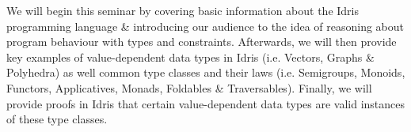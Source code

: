 We will begin this seminar by covering basic information about the Idris programming language \& introducing our audience to the idea of reasoning about program behaviour with types and constraints. Afterwards,
we will then provide key examples of value-dependent data types in Idris (i.e. Vectors, Graphs \& Polyhedra) as well common type classes and their laws (i.e. Semigroups, Monoids, Functors, Applicatives, Monads, Foldables \& Traversables).
Finally, we will provide proofs in Idris that certain value-dependent data types are valid instances of these type classes.
